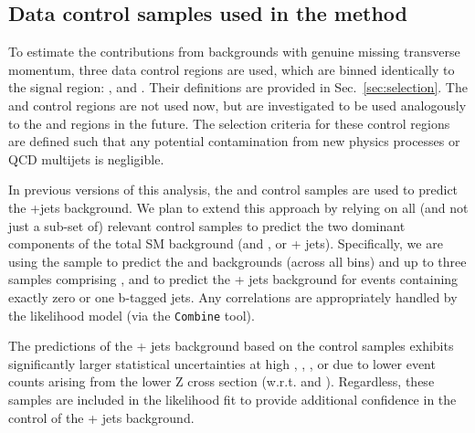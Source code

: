 \subsection{Data control samples used in the method}

To estimate the contributions from backgrounds with genuine missing transverse momentum, three data
control regions are used, which are binned identically to the signal
region: \mj, \mmj and \gj.  Their definitions are provided
in Sec.~\ref{sec:selection}. The \ej and \eej control regions are not
used now, but are investigated to be used analogously to the \mj and \mmj regions in
the future. The selection criteria for these
control regions are defined such that any potential contamination from
new physics processes or QCD multijets is negligible.

In previous versions of this analysis, the \mmj and \gj control
samples are used to predict the \znunu +jets background. We plan to
extend this approach by relying on all (and not just a sub-set of)
relevant control samples to predict the two dominant components of the
total SM background (\wj and \ttbar, or \znunu + jets). Specifically,
we are using the \mj sample to predict the \wj and \ttbar backgrounds
(across all \nb bins) and up to three samples comprising \zmmj,
\gj and \wmj to predict the \znunu + jets background for events
containing exactly zero or one b-tagged jets. Any correlations are
appropriately handled by the likelihood model (via the
\texttt{Combine} tool).

The predictions of the \znunu + jets background based on the \zmmj
control samples exhibits significantly larger statistical
uncertainties at high \njet, \nb, \scalht, or \mht due to lower event
counts arising from the lower Z cross section (w.r.t. \gj and
\wj). Regardless, these samples are included in the likelihood fit
to provide additional confidence in the control of the \znunu + jets
background.

